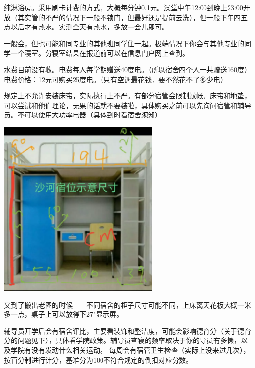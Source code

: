 
纯淋浴房。采用刷卡计费的方式，大概每分钟0.1元。澡堂中午12:00到晚上23:00开放（其实管的不严的情况下一般不锁门，但最好还是提前去洗），但一般下午四五点以后才有热水。实测全天有热水，多放一会儿即可。


一般会，但也可能和同专业的其他班同学住一起。极端情况下你会与其他专业的同学一个寝室。分寝室结果在报道前可以在信息门户网上查到。


水费目前没有收。电费每人每学期赠送40度电。（所以宿舍四个人一共赠送160度）电费价格：12元可购买25度电。（只有空调最花钱，要不然花不了多少电）


规定上不允许安装床帘，实际执行上不严。有部分宿管会限制蚊帐、床帘和地垫，可以尝试和他们理论，无果的话就不要装啦，具体购买之前可以先询问宿管和辅导员。不可以使用大功率电器（具体到时看宿舍须知）


\begin{center}
    \includegraphics[width=0.6\textwidth]{images/bed-size.png}
\end{center}

又到了搬出老图的时候——不同宿舍的柜子尺寸可能不同，上床离天花板大概一米多一点，桌子上可以放得下27"显示屏。


辅导员开学后会有宿舍评比，主要看装饰和整洁度，可能会影响德育分（关于德育分的问题见下），具体看学院政策。辅导员查寝的频率取决于你的导员有多懒，以及学院有没有发动什么相关运动。
每周会有宿管卫生检查（实际上没来过几次），按百分制进行计分，基准分为100不符合规定的倒扣对应分数。
